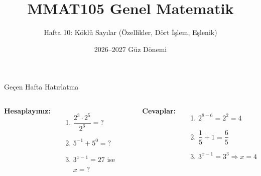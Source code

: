 \documentclass[aspectratio=169,11pt]{beamer}
\title[MMAT105 -- Hafta 10]{MMAT105 Genel Matematik}
\subtitle{Hafta 10: Köklü Sayılar (Özellikler, Dört İşlem, Eşlenik)}
\author{}
\date{2026--2027 Güz Dönemi}
\begin{document}
\begin{frame}
\titlepage
\end{frame}


\begin{frame}{Geçen Hafta Hatırlatma}
\begin{columns}[t]
\textbf{Hesaplayınız:}
\begin{enumerate}
\item \(\dfrac{2^3\cdot 2^5}{2^6}=?\)
\item \(5^{-1}+5^{0}=?\)
\item \(3^{x-1}=27\) ise \(x=?\)
\end{enumerate}
\pause
\textbf{Cevaplar:}
\begin{enumerate}
\item \(2^{8-6}=2^2=4\)
\item \(\dfrac{1}{5}+1=\dfrac{6}{5}\)
\item \(3^{x-1}=3^3\Rightarrow x=4\)
\end{enumerate}
\end{columns}
\end{frame}
\end{document}

